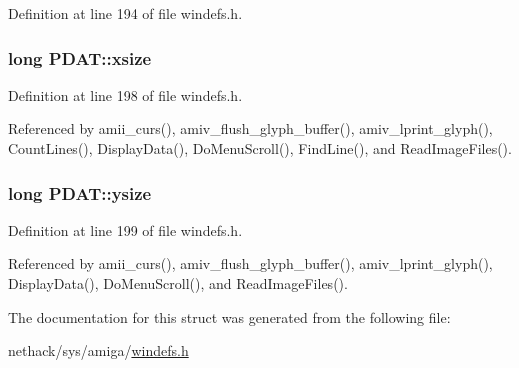 Definition at line 194 of file windefs.\+h.

\hypertarget{structPDAT_a957fade03cbfb4ce4de9df4e09be7fc7}{
\subsubsection[{xsize}]{\setlength{\rightskip}{0pt plus 5cm}long P\+D\+A\+T\+::xsize}}\label{structPDAT_a957fade03cbfb4ce4de9df4e09be7fc7}


Definition at line 198 of file windefs.\+h.



Referenced by amii\+\_\+curs(), amiv\+\_\+flush\+\_\+glyph\+\_\+buffer(), amiv\+\_\+lprint\+\_\+glyph(), Count\+Lines(), Display\+Data(), Do\+Menu\+Scroll(), Find\+Line(), and Read\+Image\+Files().

\hypertarget{structPDAT_ad7ef994c367e747b85e09149fdccff1b}{
\subsubsection[{ysize}]{\setlength{\rightskip}{0pt plus 5cm}long P\+D\+A\+T\+::ysize}}\label{structPDAT_ad7ef994c367e747b85e09149fdccff1b}


Definition at line 199 of file windefs.\+h.



Referenced by amii\+\_\+curs(), amiv\+\_\+flush\+\_\+glyph\+\_\+buffer(), amiv\+\_\+lprint\+\_\+glyph(), Display\+Data(), Do\+Menu\+Scroll(), and Read\+Image\+Files().



The documentation for this struct was generated from the following file\+:\begin{DoxyCompactItemize}
\item 
nethack/sys/amiga/\hyperlink{windefs_8h}{windefs.\+h}\end{DoxyCompactItemize}
